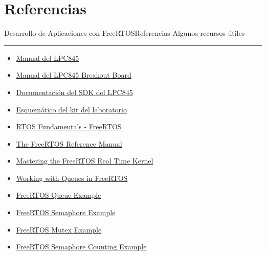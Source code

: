 \documentclass[aspectratio=169, xcolor=dvipsnames]{beamer}
\begin{document}
\section{Referencias}
\begin{frame}{Desarrollo de Aplicaciones con FreeRTOS}{Referencias}
    Algunos recursos útiles
    \noindent\rule{\textwidth}{0.75pt}
    \begin{multicols}{2}
    \begin{itemize}
        \item \href{https://github.com/utn-fra-lse/lpc845/blob/main/docs/UM11029.pdf}{Manual del LPC845}
        \item \href{https://github.com/utn-fra-lse/lpc845/blob/main/docs/UM11181.pdf}{Manual del LPC845 Breakout Board}
        \item \href{https://mcuxpresso.nxp.com/api_doc/dev/116/modules.html}{Documentación del SDK del LPC845}
        \item \href{https://github.com/utn-fra-lse/lpc845/blob/main/docs/BASE_KIT_V0.pdf}{Esquemático del kit del laboratorio}
        \item \href{https://www.freertos.org/Documentation/01-FreeRTOS-quick-start/01-Beginners-guide/01-RTOS-fundamentals}{RTOS Fundamentals - FreeRTOS}
        \item \href{https://www.freertos.org/media/2018/FreeRTOS_Reference_Manual_V10.0.0.pdf}{The FreeRTOS Reference Manual}
        \item \href{https://github.com/FreeRTOS/FreeRTOS-Kernel-Book/releases/download/V1.0/Mastering-the-FreeRTOS-Real-Time-Kernel.v1.0.pdf}{Mastering the FreeRTOS Real Time Kernel}
        \item \href{https://www.phippselectronics.com/working-with-queues-in-freertos/?srsltid=AfmBOoqADQtj43nCXhWAF3RlDFPmQAGASm-NVfMp3yBOcVNQ9WwPgjF0}{Working with Queues in FreeRTOS}
        \item \href{https://www.digikey.com/en/maker/projects/introduction-to-rtos-solution-to-part-5-freertos-queue-example/72d2b361f7b94e0691d947c7c29a03c9}{FreeRTOS Queue Example}
        \item \href{https://www.digikey.com/en/maker/projects/introduction-to-rtos-solution-to-part-7-freertos-semaphore-example/51aa8660524c4daba38cba7c2f5baba7}{FreeRTOS Semaphore Example}
        \item \href{https://www.digikey.com/en/maker/projects/introduction-to-rtos-solution-to-part-6-freertos-mutex-example/c6e3581aa2204f1380e83a9b4c3807a6}{FreeRTOS Mutex Example}
        \item \href{https://www.digikey.se/en/maker/projects/introduction-to-rtos-solution-to-part-7-freertos-semaphore-example/51aa8660524c4daba38cba7c2f5baba7}{FreeRTOS Semaphore Counting Example}
    \end{itemize}
    \end{multicols}
\end{frame}
\end{document}
